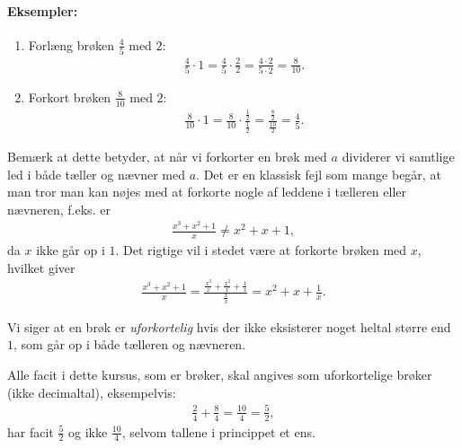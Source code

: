 \paragraph{Eksempler:}
\begin{enumerate}
\item Forlæng brøken $\frac{4}{5}$ med $2$:
\begin{align*}
\frac{4}{5} \cdot 1 = \frac{4}{5} \cdot \frac{2}{2} = \frac{4 \cdot 2}{5 \cdot 2} = \frac{8}{10}.
\end{align*}
\item Forkort brøken $\frac{8}{10}$ med $2$:
\begin{align*}
\frac{8}{10} \cdot 1 = \frac{8}{10} \cdot  \frac{\frac{1}{2}}{\frac{1}{2}} = \frac{\frac{8}{2}}{\frac{10}{2}} = \frac{4}{5}.
\end{align*}
\end{enumerate}
Bemærk at dette betyder, at når vi forkorter en brøk med $a$ dividerer vi samtlige led i både tæller og nævner med $a$. Det er en klassisk fejl som mange begår, at man tror man kan nøjes med at forkorte nogle af leddene i tælleren eller nævneren, f.eks. er
\begin{align*}
\frac{x^3+x^2+1}{x} \neq x^2+x+1,
\end{align*} 
da $x$ ikke går op i $1$. Det rigtige vil i stedet være at forkorte brøken med $x$, hvilket giver
\begin{align*}
\frac{x^3+x^2+1}{x}= \frac{\frac{x^3}{x}+\frac{x^2}{x}+ \frac{1}{x}}{\frac{x}{x}} = x^2+x+\frac{1}{x}.
\end{align*}

Vi siger at en brøk er \emph{uforkortelig} hvis der ikke eksisterer noget heltal større end $1$, som går op i både tælleren og nævneren. 

Alle facit i dette kursus, som er brøker, skal angives som uforkortelige brøker (ikke decimaltal), eksempelvis:
\begin{align*}
\frac{2}{4}+\frac{8}{4} = \frac{10}{4} = \frac{5}{2},
\end{align*}
har facit $\frac{5}{2}$ og ikke $\frac{10}{4}$, selvom tallene i princippet et ens. 













